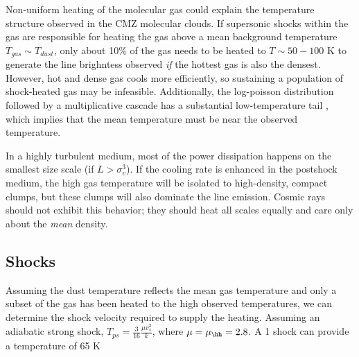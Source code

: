 Non-uniform heating of the molecular gas could explain the temperature
structure observed in the CMZ molecular clouds.  If supersonic shocks within
the gas are responsible for heating the gas above a mean background temperature
$T_{gas} \sim T_{dust}$, only about 10\% of the gas needs to be heated to
$T\sim50-100$ K to generate the line brighntess observed \emph{if} the hottest
gas is also the densest.  However, hot and dense gas cools more efficiently, so
sustaining a population of shock-heated gas may be infeasible.  Additionally,
the log-poisson distribution followed by a multiplicative cascade has a substantial
low-temperature tail \citep{Pan2009a}, which implies that the mean temperature
must be near the observed temperature.



  In a highly turbulent medium, most of the power
dissipation happens on the smallest size scale (if $L > \sigma_v^3$).  If the
cooling rate is enhanced in the postshock medium, the high gas temperature will
be isolated to high-density, compact clumps, but these clumps will also
dominate the line emission.  
Cosmic rays should not exhibit this behavior; they should heat all scales equally
and care only about the \emph{mean} density.

\subsection{Shocks}
Assuming the dust temperature reflects the mean gas temperature and only a subset
of the gas has been heated to the high observed temperatures, we can determine the
shock velocity required to supply the heating.  Assuming an adiabatic strong shock,
$T_{ps} = \frac{3}{16}\frac{\mu v_s^2}{k}$, where $\mu = \mu_{\hh} = 2.8$.  A 1 \kms
shock can provide a temperature of 65 K

